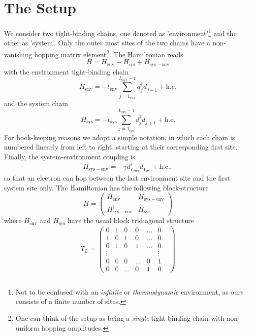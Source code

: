 \documentclass{article}
\newcommand{\pdagger}{{\phantom{\dagger}}}
\begin{document}
\section{The Setup}
We consider two tight-binding chains, one denoted as 'environment'\footnote{Not to be confused with an \textit{infinite} or \textit{thermodynamic} environment, as ours consists of a finite number of sites.} and the other as 'system'. Only the outer most sites of the two chains have a non-vanishing hopping matrix element\footnote{One can think of the setup as being a \textit{single} tight-binding chain with non-uniform hopping amplitudes.}. The Hamiltonian reads
\begin{equation}
	H = H_\mathrm{env} + H_\mathrm{sys} + H_\mathrm{sys-env}
\end{equation}
with the environment tight-binding chain
\begin{equation}
	H_\mathrm{env} = -t_\mathrm{env}\sum_{j=1_\mathrm{env}}^{L_\mathrm{env}-1} d_j^\dagger d_{j+1}^\pdagger +\mathrm{h.c.}
\end{equation}
and the system chain
\begin{equation}
	H_\mathrm{sys} = -t_\mathrm{sys}\sum_{j=1_\mathrm{sys}}^{L_\mathrm{sys}-1} d_j^\dagger d_{j+1}^\pdagger +\mathrm{h.c.}
\end{equation}
For book-keeping reasons we adopt a simple notation, in which each chain is numbered linearly from left to right, starting at their corresponding first site.
Finally, the system-environment coupling is
\begin{equation}
	H_\mathrm{sys-env} = -\gamma d_{L_\mathrm{env}}^\dagger d_{1_\mathrm{sys}}^\pdagger + \mathrm{h.c.},
\end{equation}
so that an electron can hop between the last environment site and the first system site only. 
The Hamiltonian has the following block-structure
\begin{equation}
	H = \begin{pmatrix}
		H_\mathrm{env} & H_\mathrm{sys-env} \\
		H_\mathrm{sys-env}^\dagger & H_\mathrm{sys}
	\end{pmatrix}
\end{equation}
where $H_\mathrm{env}$ and  $H_\mathrm{sys}$ have the usual block tridiagonal structure
\begin{equation}
	T_{L} = \begin{pmatrix}
		0 & 1 & 0 &  0 & \dots & 0\\
		1 & 0 & 1 &  0 &\dots & 0\\
		0 & 1 & 0 & 1 & \dots & 0\\
		
		\vdots &   &  &    &    & \vdots & \\
		0 & 0 & 0 &  \dots& 0  & 1\\
		0 & 0 &  \dots & 0 & 1 &  0
	\end{pmatrix}
\end{equation}
\end{document}
